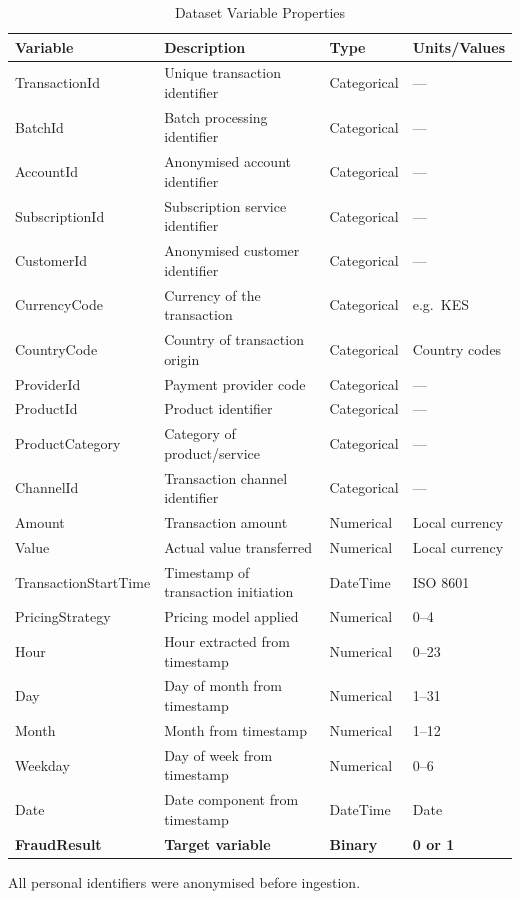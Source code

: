 \documentclass[a4paper,fleqn]{cas-sc}
\begin{document}
\begin{table}[H]
\centering
\caption{Dataset Variable Properties}
\label{tab:dataset_properties}
\begin{threeparttable}
\small
\begin{tabular}{@{}llll@{}}
\toprule
\textbf{Variable} & \textbf{Description} & \textbf{Type} & \textbf{Units/Values} \\
\midrule
TransactionId     & Unique transaction identifier     & Categorical & --- \\
BatchId           & Batch processing identifier       & Categorical & --- \\
AccountId         & Anonymised account identifier     & Categorical & --- \\
SubscriptionId    & Subscription service identifier   & Categorical & --- \\
CustomerId        & Anonymised customer identifier    & Categorical & --- \\
CurrencyCode      & Currency of the transaction       & Categorical & e.g.\ KES \\
CountryCode       & Country of transaction origin     & Categorical & Country codes \\
ProviderId        & Payment provider code             & Categorical & --- \\
ProductId         & Product identifier                & Categorical & --- \\
ProductCategory   & Category of product/service       & Categorical & --- \\
ChannelId         & Transaction channel identifier    & Categorical & --- \\
Amount            & Transaction amount                & Numerical   & Local currency \\
Value             & Actual value transferred          & Numerical   & Local currency \\
TransactionStartTime & Timestamp of transaction initiation & DateTime & ISO 8601 \\
PricingStrategy   & Pricing model applied             & Numerical   & 0--4 \\
Hour              & Hour extracted from timestamp     & Numerical   & 0--23 \\
Day               & Day of month from timestamp       & Numerical   & 1--31 \\
Month             & Month from timestamp              & Numerical   & 1--12 \\
Weekday           & Day of week from timestamp        & Numerical   & 0--6 \\
Date              & Date component from timestamp     & DateTime    & Date \\
\textbf{FraudResult} & \textbf{Target variable}       & \textbf{Binary} & \textbf{0 or 1} \\
\bottomrule
\end{tabular}
\begin{tablenotes}
\footnotesize
\item All personal identifiers were anonymised before ingestion.
\end{tablenotes}
\end{threeparttable}
\end{table}
\end{document}

